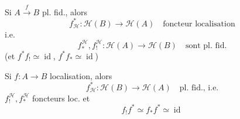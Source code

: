 Si $A\xrightarrow{f}B$ pl. fid., alors
\[
f_{\mathcal H}^*:\mathcal H(B)\longrightarrow\mathcal H(A)
\quad\text{foncteur localisation}
\]
i.e.
\[
f_*^{\mathcal H},f_!^{\mathcal H}:\mathcal H(A)\longrightarrow\mathcal H(B)
\quad\text{sont pl. fid.}
\]
(et $f^*f_!\simeq\operatorname{id}$, $f^*f_*\simeq\operatorname{id}$)

Si $f:A\longrightarrow B$ localisation, alors
\[
f_{\mathcal H}^*:\mathcal H(B)\longrightarrow\mathcal H(A)
\quad\text{pl. fid., i.e.}
\]
$f_!^{\mathcal H},f_*^{\mathcal H}$ foncteurs loc.  et
\[
f_!f^*\simeq f_*f^*\simeq\operatorname{id}
\]
